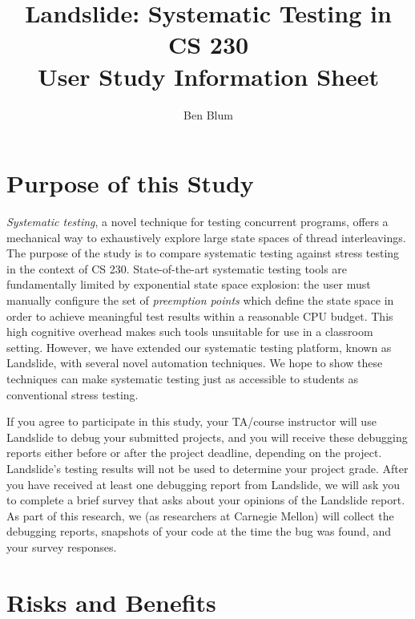 \documentclass{article}
\begin{document}

\newcommand\classname{CS 230}
\title{\bf Landslide: Systematic Testing in \classname \\ User Study Information Sheet}
\author{Ben Blum}
\date{}
\maketitle

\section{Purpose of this Study}

{\em Systematic testing}, a novel technique for testing concurrent programs, offers a mechanical way to exhaustively explore large state spaces of thread interleavings.
The purpose of the study is to compare systematic testing against stress testing in the context of \classname.
State-of-the-art systematic testing tools are fundamentally limited by exponential state space explosion: the user must manually configure the set of {\em preemption points} which define the state space in order to achieve meaningful test results within a reasonable CPU budget.
This high cognitive overhead makes such tools unsuitable for use in a classroom setting.
However, we have extended our systematic testing platform, known as Landslide, with several novel automation techniques.
We hope to show these techniques can make systematic testing just as accessible to students as conventional stress testing.

If you agree to participate in this study, your TA/course instructor will use Landslide to debug your submitted projects, and you will receive these debugging reports either before or after the project deadline, depending on the project.
Landslide's testing results will not be used to determine your project grade.
After you have received at least one debugging report from Landslide, we will ask you to complete a brief survey that asks about your opinions of the Landslide report.
As part of this research, we (as researchers at Carnegie Mellon) will collect the debugging reports, snapshots of your code at the time the bug was found, and your survey responses.

\section{Risks and Benefits}
\end{document}
